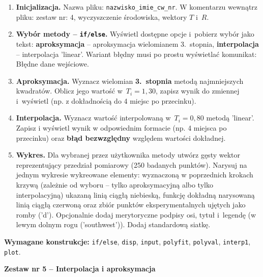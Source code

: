 \documentclass[a4paper,11pt]{article}
\begin{document}
\begin{enumerate}[leftmargin=*, label=\textbf{\arabic*.}, itemsep=2pt]

  \item \textbf{Inicjalizacja.}
    Nazwa pliku: \texttt{nazwisko\_imie\_cw\_nr}. W komentarzu wewnątrz pliku: zestaw nr: 4, wyczyszczenie środowiska, wektory $T$ i~$R$.

  \item \textbf{Wybór metody -- \texttt{if/else}.}
    Wyświetl dostępne opcje i~pobierz wybór jako tekst: \textbf{aproksymacja} -- aproksymacja wielomianem 3.~stopnia, \textbf{interpolacja} -- interpolacja 'linear'. Wariant błędny musi po prostu wyświetlać komunikat: Błędne dane wejściowe.

  \item \textbf{Aproksymacja.}
    Wyznacz wielomian \textbf{3.~stopnia} metodą najmniejszych kwadratów. Oblicz jego wartość w~$T_i = 1{,}30$, zapisz wynik do zmiennej i~wyświetl (np. z dokładnością do 4 miejsc po przecinku).

  \item \textbf{Interpolacja.}
    Wyznacz wartość interpolowaną w~$T_i = 0{,}80$ metodą 'linear'. Zapisz i wyświetl wynik w odpowiednim formacie (np. 4 miejsca po przecinku) oraz \textbf{błąd bezwzględny} względem wartości dokładnej.

  \item \textbf{Wykres.}
    Dla wybranej przez użytkownika metody utwórz gęsty wektor reprezentujący przedział pomiarowy (250 badanych punktów). Narysuj na jednym wykresie wykreowane elementy: wyznaczoną w poprzednich krokach krzywą (zależnie od wyboru -- tylko aproksymacyjną albo tylko interpolacyjną) ukazaną linią ciągłą niebieską, funkcję dokładną narysowaną linią ciągłą czerwoną oraz zbiór punktów eksperymentalnych ujętych jako romby ('d'). Opcjonalnie dodaj merytoryczne podpisy osi, tytuł i~legendę (w lewym dolnym rogu ('southwest')). Dodaj standardową siatkę.

\end{enumerate}

\vspace{0.3cm}
\begin{ramka}
\textbf{Wymagane konstrukcje:}
\texttt{if/else}, \texttt{disp}, \texttt{input}, \texttt{polyfit}, \texttt{polyval}, \texttt{interp1}, \texttt{plot}.
\end{ramka}

\clearpage
\begin{center}
  {\large\bfseries Zestaw nr 5 \quad -- \quad Interpolacja i aproksymacja}
\end{center}
\hrulefill
\vspace{0.4cm}
\end{document}
